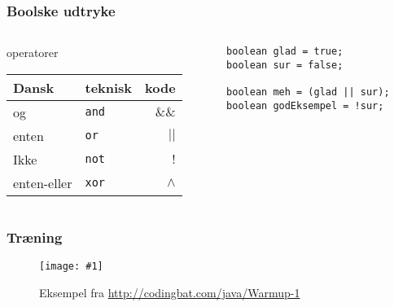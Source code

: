 \documentclass{beamer}
\newcommand{\FIG}[2]{
  \begin{figure}[]
    \centering
    \texttt{[image: \#1]}
    \caption{#2}
    \label{fig:#1}
  \end{figure}
}
\begin{document}
\begin{frame}[fragile]
  \frametitle{Boolske udtryke}
  \begin{columns}
    \begin{column}{0.5\textwidth}
      \begin{block}{operatorer}
        \begin{table}[h]
          \centering
          \begin{tabular}{llr}
            Dansk & teknisk & kode \\
            \hline
            og & \texttt{and} & $\&\&$ \\
            enten & \texttt{or} & $|| $\\
            Ikke & \texttt{not} & $!$\\
            enten-eller & \texttt{xor} & $\wedge$\\
          \end{tabular}
        \end{table}
      \end{block}
    \end{column}
    \begin{column}{0.5\textwidth}
\begin{verbatim} 
boolean glad = true;
boolean sur = false;

boolean meh = (glad || sur);
boolean godEksempel = !sur;

\end{verbatim}
    \end{column}
  \end{columns}
\end{frame}



\begin{frame}
  \frametitle{Træning}

  \FIG{codingbat}{Eksempel fra \url{http://codingbat.com/java/Warmup-1}}

\end{frame}
\end{document}
